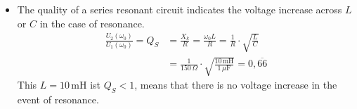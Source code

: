 {\begin{itemize}
    The corresponding values are:\\
    \begin{tabular}{cccccccc}
    \toprule
        $\omega$ & $0$ & $100\,\mathrm{s}^{-1}$ & $2000\,\mathrm{s}^{-1}$ & $3500\,\mathrm{s}^{-1}$ & $\omega_0$ & $10000\,\mathrm{s}^{-1}$ & $\omega\to\infty$\\
    \midrule
        $A(\omega)$ & $1,000$ & $1,009$ & $1,033$ & $1,087$ & $0,943$ & $0,555$ & $0$ \\
    \bottomrule
    \end{tabular}
    \item[d)] The quality of a series resonant circuit indicates the voltage increase across $L$ or $C$
    in the case of resonance.
    \begin{align*}
        \frac{U_2(\omega_0)}{U_1(\omega_0)} = Q_S &= \frac{X_k}{R} = \frac{\omega_0 L}{R} = \frac{1}{R}\cdot\sqrt{\frac{L}{C}}\\
        &= \frac{1}{150\,\Omega}\cdot\sqrt{\frac{10\,\mathrm{mH}}{1\,\mu\mathrm{F}}}= 0,\overline{66} %
    \end{align*}
    This $L=10\,\mathrm{mH}$ ist $Q_S < 1$, means that there is no voltage increase in the event of resonance.
\end{itemize}
}


